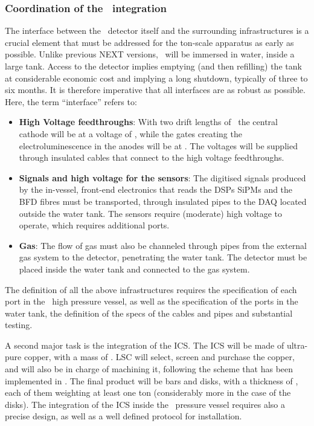 \subsubsection*{Coordination of the \NHD\ integration}

The interface between the \NHD\ detector itself and the surrounding infrastructures is a crucial element that must be addressed for the ton-scale apparatus as early as possible. Unlike previous NEXT versions, \NHD\ will be immersed in water, inside a large tank. Access to the detector implies emptying (and then refilling) the tank at considerable economic cost and implying a long shutdown, typically of three to six  months. It is therefore imperative that all interfaces are as robust as possible. Here, the term ``interface'' refers to:

\begin{itemize}[noitemsep,topsep=0pt,parsep=0pt,partopsep=0pt]
\item {\bf High Voltage feedthroughs}:  With two drift lengths of \XHDL\ the central cathode will be at a voltage of \XHDHV, while the gates creating the electroluminescence in the anodes will be at \XHDELHV. The voltages will be supplied through insulated cables that connect to the high voltage feedthroughs. \item {\bf Signals and high voltage for the sensors}:  The digitised signals produced by the in-vessel, front-end electronics that reads the DSPs SiPMs and the BFD fibres must be transported, through insulated pipes to the DAQ located outside the water tank. The sensors require (moderate) high voltage to operate, which requires additional ports.
\item {\bf Gas}: The flow of gas must also be channeled through pipes from the external gas system to the detector, penetrating the water tank. The detector must be placed inside the water tank and connected to the gas system. 
\end{itemize}

\indent

The {definition} of all the above infrastructures requires the specification of each port in the \NHD\ high pressure vessel, as well as the specification of the ports in the water tank, the definition of the specs of the cables and pipes and substantial testing. 
\indent

A second major task is the integration of the ICS. The ICS will be made of ultra-pure copper, with a mass of \XHDS. LSC will select, screen and purchase the copper, and will also be in charge of machining it, following the scheme that has been implemented in \Next. The final product will be bars and disks, with a thickness of \XHDCS, each of them weighting at least one ton (considerably more in the case of the disks). The integration of the ICS inside the \NHD\ pressure vessel requires also a precise design, as well as a well defined protocol for installation. 

